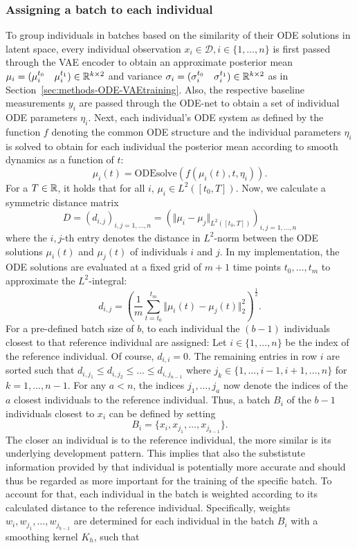 \subsubsection{Assigning a batch to each individual}

To group individuals in batches based on the similarity of their ODE solutions in latent space, every individual observation $x_i\in \mathcal{D}, i\in\lbrace1,\dots, n\rbrace$ is first passed through the VAE encoder to obtain an approximate posterior mean $\mu_i= (\mu_i^{t_0} \quad \mu_i^{t_1}) \in \mathbb{R}^{k\times 2}$ and variance $\sigma_i = (\sigma_i^{t_0} \quad \sigma_i^{t_1}) \in \mathbb{R}^{k\times 2}$ as in Section~\ref{sec:methods-ODE-VAEtraining}. Also, the respective baseline measurements $y_i$ are passed through the ODE-net to obtain a set of individual ODE parameters $\eta_i$. Next, each individual's ODE system as defined by the function $f$ denoting the common ODE structure and the individual parameters $\eta_i$ is solved to obtain for each individual the posterior mean according to smooth dynamics as a function of $t$:
$$\mu_i(t) = \mathrm{ODEsolve}(f(\mu_i(t), t, \eta_i)).$$
For a $T \in \mathbb{R}$, it holds that for all $i$, $\mu_{i} \in L^2([t_0,T])$. Now, we calculate a symmetric distance matrix 
$$D= (d_{i,j})_{i,j=1,\dots,n} = \left(\Vert \mu_i - \mu_j\Vert_{L^2([t_0,T])}\right)_{i,j=1,\dots,n}$$ 
where the $i,j$-th entry denotes the distance in $L^2$-norm between the ODE solutions $\mu_i(t)$ and $\mu_j(t)$ of individuals $i$ and $j$. In my implementation, the ODE solutions are evaluated at a fixed grid of $m+1$ time points $t_0,\dots, t_m$ to approximate the $L^2$-integral:
\begin{equation}\label{eq:discretisationl2norm}
	d_{i,j} = \left( \frac{1}{m} \sum_{t=t_0}^{t_m} \Vert \mu_i(t) - \mu_j(t)\Vert_2^2 \right)^{\frac{1}{2}}.
\end{equation}
For a pre-defined batch size of $b$, to each individual the $(b-1)$ individuals closest to that reference individual are assigned: 
Let $i\in\lbrace1,\dots, n\rbrace$ be the index of the reference individual. Of course, $d_{i,i}= 0$. The remaining entries in row $i$ are sorted such that $d_{i,j_1} \leq d_{i,j_2} \leq \dots \leq d_{i,j_{n-1}}$ where $j_k \in \lbrace 1,\dots , i-1, i+1, \dots, n\rbrace$ for $k=1,\dots, n-1$. 
For any $a <n$, the indices $j_1,\dots, j_a$ now denote the indices of the $a$ closest individuals to the reference individual. Thus, a batch $B_i$ of the $b-1$ individuals closest to $x_i$ can be defined by setting 
$$
B_i = \lbrace x_i, x_{j_1},\dots, x_{j_{b-1}} \rbrace.
$$ 
The closer an individual is to the reference individual, the more similar is its underlying development pattern. This implies that also the substistute information provided by that individual is potentially more accurate and should thus be regarded as more important for the training of the specific batch. To account for that, each individual in the batch is weighted according to its calculated distance to the reference individual. Specifically, weights $w_i, w_{j_1},\dots, w_{j_{b-1}}$ are determined for each individual in the batch $B_i$ with a smoothing kernel $K_h$, such that 
